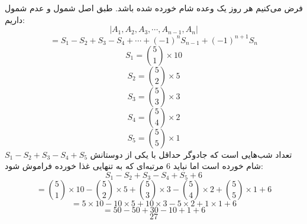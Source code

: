فرض می‌کنیم هر روز یک وعده شام خورده شده باشد.
طبق اصل شمول و عدم شمول داریم:
$$|A_1, A_2, A_3, \cdots, A_{n-1}, A_n|$$
$$= S_1 - S_2 + S_3 - S_4 + \cdots + (-1)^nS_{n-1} + (-1)^{n+1}S_n $$
	\p
$$S_1 = \binom{5}{1} \times 10$$
$$S_2 = \binom{5}{2} \times 5$$
$$S_3 = \binom{5}{3} \times 3$$
$$S_4 = \binom{5}{4} \times 2$$
$$S_5 = \binom{5}{5} \times 1$$
	\p
$S_1 - S_2 + S_3 - S_4 + S_5$
تعداد شب‌هایی است که جادوگر حداقل با یکی از دوستانش شام خورده است اما نباید
$6$
مرتبه‌ای که به تنهایی غذا خورده فراموش شود:
$$S_1 - S_2 + S_3 - S_4 + S_5 + 6$$
$$= \binom{5}{1} \times 10 - \binom{5}{2} \times 5 + \binom{5}{3} \times 3 - \binom{5}{4} \times 2 + \binom{5}{5} \times 1 + 6$$
$$= 5 \times 10 - 10 \times 5 + 10 \times 3 - 5 \times 2 + 1 \times 1 + 6$$
$$= 50 - 50 + 30 -10 + 1 + 6$$
$$27$$